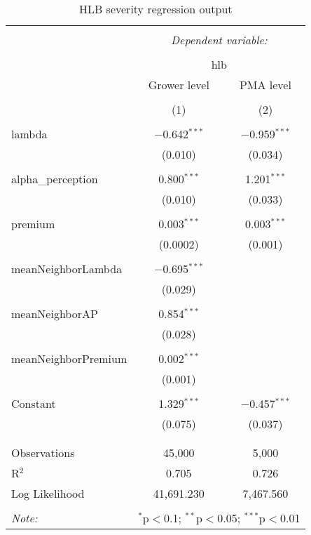 
\begin{table}[!htbp] \centering 
  \caption{HLB severity regression output} 
  \label{Tab:InformationConfidence-ExpectedValue-regtable-combined} 
\begin{tabular}{@{\extracolsep{5pt}}lcc} 
\\[-1.8ex]\hline 
\hline \\[-1.8ex] 
 & \multicolumn{2}{c}{\textit{Dependent variable:}} \\ 
\cline{2-3} 
\\[-1.8ex] & \multicolumn{2}{c}{hlb} \\ 
 & Grower level & PMA level \\ 
\\[-1.8ex] & (1) & (2)\\ 
\hline \\[-1.8ex] 
 lambda & $-$0.642$^{***}$ & $-$0.959$^{***}$ \\ 
  & (0.010) & (0.034) \\ 
  & & \\ 
 alpha\_perception & 0.800$^{***}$ & 1.201$^{***}$ \\ 
  & (0.010) & (0.033) \\ 
  & & \\ 
 premium & 0.003$^{***}$ & 0.003$^{***}$ \\ 
  & (0.0002) & (0.001) \\ 
  & & \\ 
 meanNeighborLambda & $-$0.695$^{***}$ &  \\ 
  & (0.029) &  \\ 
  & & \\ 
 meanNeighborAP & 0.854$^{***}$ &  \\ 
  & (0.028) &  \\ 
  & & \\ 
 meanNeighborPremium & 0.002$^{***}$ &  \\ 
  & (0.001) &  \\ 
  & & \\ 
 Constant & 1.329$^{***}$ & $-$0.457$^{***}$ \\ 
  & (0.075) & (0.037) \\ 
  & & \\ 
\hline \\[-1.8ex] 
Observations & 45,000 & 5,000 \\ 
R$^{2}$ & 0.705 & 0.726 \\ 
Log Likelihood & 41,691.230 & 7,467.560 \\ 
\hline 
\hline \\[-1.8ex] 
\textit{Note:}  & \multicolumn{2}{r}{$^{*}$p$<$0.1; $^{**}$p$<$0.05; $^{***}$p$<$0.01} \\ 
\end{tabular} 
\end{table} 
